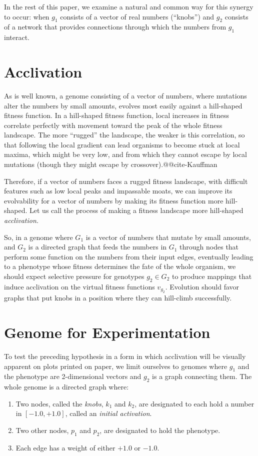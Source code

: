 \documentclass[letterpaper]{article}
\begin{document}
In the rest of this paper, we examine a natural and common way for this
synergy to occur: when $g_1$ consists of a vector of real numbers (``knobs'')
and $g_2$ consists of a network that provides connections through which the
numbers from $g_1$ interact.

\section{Acclivation}

As is well known, a genome consisting of a vector of numbers, where mutations
alter the numbers by small amounts, evolves most easily against a hill-shaped
fitness function. In a hill-shaped fitness function, local increases in
fitness correlate perfectly with movement toward the peak of the whole fitness
landscape. The more ``rugged'' the landscape, the weaker is this correlation,
so that following the local gradient can lead organisms to become stuck at
local maxima, which might be very low, and from which they cannot escape by
local mutations (though they might escape by crossover).@@cite-Kauffman

Therefore, if a vector of numbers faces a rugged fitness landscape, with
difficult features such as low local peaks and impassable moats, we can
improve its evolvability for a vector of numbers by making its fitness
function more hill-shaped. Let us call the process of making a fitness
landscape more hill-shaped \textit{acclivation.}

So, in a genome where $G_1$ is a vector of numbers that mutate by small
amounts, and $G_2$ is a directed graph that feeds the numbers in $G_1$ through
nodes that perform some function on the numbers from their input edges,
eventually leading to a phenotype whose fitness determines the fate of the
whole organism, we should expect selective pressure for genotypes $g_2 \in
G_2$ to produce mappings that induce acclivation on the virtual fitness
functions $v_{g_2}$. Evolution should favor graphs that put knobs in a
position where they can hill-climb successfully.

\section{Genome for Experimentation}

To test the preceding hypothesis in a form in which acclivation will be
visually apparent on plots printed on paper, we limit ourselves to genomes
where $g_1$ and the phenotype are 2-dimensional vectors and $g_2$ is a graph
connecting them.  The whole genome is a directed graph where:
\begin{enumerate}
   \item Two nodes, called the \textit{knobs}, $k_1$ and $k_2$, are designated
      to each hold a number in $[-1.0, +1.0]$, called an \textit{initial
      activation}.
   \item Two other nodes, $p_1$ and $p_2$, are designated to hold the
      phenotype.
   \item Each edge has a weight of either $+1.0$ or $-1.0$.
\end{enumerate}
\end{document}
